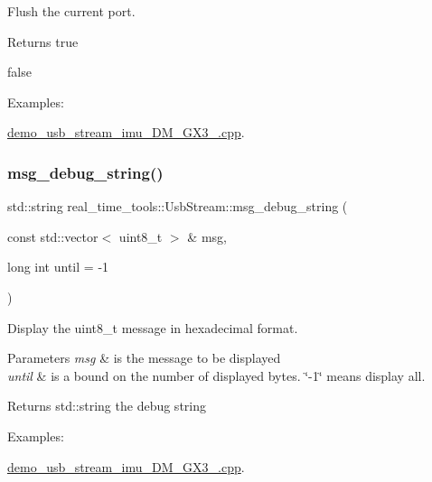 Flush the current port. 

\begin{DoxyReturn}{Returns}
true 

false 
\end{DoxyReturn}
\begin{Desc}
\item[Examples\+: ]\par
\hyperlink{demo_usb_stream_imu_3DM_GX3_25_8cpp-example}{demo\+\_\+usb\+\_\+stream\+\_\+imu\+\_\+D\+M\+\_\+\+G\+X3\+\_.\+cpp}.\end{Desc}
\mbox{\label{classreal__time__tools_1_1UsbStream_ac98f3cad23dbc85f47405c3809a22198}} 
\subsubsection{\texorpdfstring{msg\+\_\+debug\+\_\+string()}{msg\_debug\_string()}}
{\footnotesize\ttfamily std\+::string real\+\_\+time\+\_\+tools\+::\+Usb\+Stream\+::msg\+\_\+debug\+\_\+string (\begin{DoxyParamCaption}\item[{const std\+::vector$<$ uint8\+\_\+t $>$ \&}]{msg,  }\item[{long int}]{until = {\ttfamily -\/1} }\end{DoxyParamCaption})\hspace{0.3cm}{\ttfamily [static]}}



Display the uint8\+\_\+t message in hexadecimal format. 


\begin{DoxyParams}{Parameters}
{\em msg} & is the message to be displayed \\
\hline
{\em until} & is a bound on the number of displayed bytes. \char`\"{}-\/1\char`\"{} means display all. \\
\hline
\end{DoxyParams}
\begin{DoxyReturn}{Returns}
std\+::string the debug string 
\end{DoxyReturn}
\begin{Desc}
\item[Examples\+: ]\par
\hyperlink{demo_usb_stream_imu_3DM_GX3_25_8cpp-example}{demo\+\_\+usb\+\_\+stream\+\_\+imu\+\_\+D\+M\+\_\+\+G\+X3\+\_.\+cpp}.\end{Desc}
\mbox{\label{classreal__time__tools_1_1UsbStream_a1f6915c42d9742ced10e99d2edf7d8b1}} 
